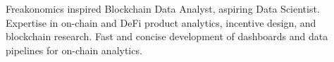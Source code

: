 
Freakonomics inspired Blockchain Data Analyst, aspiring Data Scientist. Expertise in on-chain and DeFi product analytics, incentive design, and blockchain research. Fast and concise development of dashboards and data pipelines for on-chain analytics.